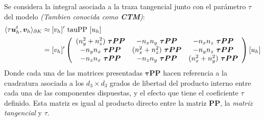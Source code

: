 \documentclass{article}
\begin{document}

\noindent Se considera la integral asociada a la traza tangencial junto con el parámetro $\tau$ del modelo \textit{(Tambien conocida como \textbf{CTM})}:
\begin{align}
    \begin{split}
    \langle \tau\boldsymbol{u}_h^t, \boldsymbol{v}_h \rangle_{\partial K} &\approx
    [v_h]'~\mathrm{tauPP}~[u_h] \\ &=
    [v_h]'
    \left(
    \begin{array}{ccc}
        (n_y^2 + n_z^2)~\boldsymbol{\tau PP} & -n_x n_y~\boldsymbol{\tau PP} & -n_x n_z~\boldsymbol{\tau PP} \\
        -n_y n_x~\boldsymbol{\tau PP} & (n_x^2 + n_z^2)~\boldsymbol{\tau PP} & -n_y n_z~\boldsymbol{\tau PP} \\
        -n_z n_x~\boldsymbol{\tau PP} & -n_z n_y~\boldsymbol{\tau PP} & (n_x^2 + n_y^2)~\boldsymbol{\tau PP} \\
    \end{array}
    \right)
    [u_h]
\end{split}
\end{align}
\noindent Donde cada una de las matrices presentadas $\boldsymbol{\tau PP}$ hacen referencia a la cuadratura asociada a los $d_3 \times d_3$ grados de libertad del producto interno entre cada una de las componentes dispuestas, y el efecto que tiene el coeficiente $\tau$ definido. Esta matriz es igual al producto directo entre la matriz $\mathbf{PP}$, la \textit{matriz tangencial} y $\tau$.
\end{document}
